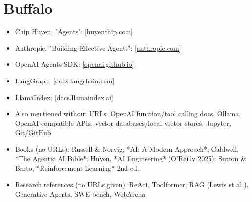 \documentclass[10pt,oneside]{report}
\begin{document}
\section{Buffalo}
{\small\begin{itemize}
\item Chip Huyen, "Agents": \href{https://huyenchip.com/2025/01/07/agents.html}{[huyenchip.com]}
\item Anthropic, "Building Effective Agents": \href{https://www.anthropic.com/engineering/building-effective-agents}{[anthropic.com]}
\item OpenAI Agents SDK: \href{https://openai.github.io/openai-agents-python/}{[openai.github.io]}
\item LangGraph: \href{https://docs.langchain.com/oss/python/langgraph/overview}{[docs.langchain.com]}
\item LlamaIndex: \href{https://docs.llamaindex.ai/}{[docs.llamaindex.ai]}
\item Also mentioned without URLs: OpenAI function/tool calling docs, Ollama, OpenAI-compatible APIs, vector databases/local vector stores, Jupyter, Git/GitHub
\item Books (no URLs): Russell \& Norvig, *AI: A Modern Approach*; Caldwell, *The Agentic AI Bible*; Huyen, *AI Engineering* (O'Reilly 2025); Sutton \& Barto, *Reinforcement Learning* 2nd ed.
\item Research references (no URLs given): ReAct, Toolformer, RAG (Lewis et al.), Generative Agents, SWE-bench, WebArena
\end{itemize}}
\end{document}
